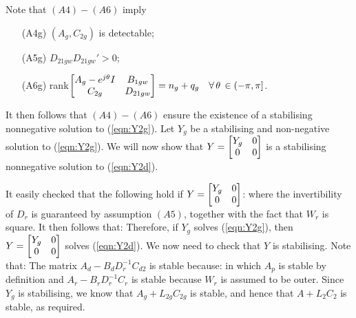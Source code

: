 \begin{pf}
Note that $(A4)-(A6)$ imply 
\begin{itemize}
\item[(A4g)] $(A_g,C_{2g})$ is detectable; 
\item[(A5g)] $D_{21gw}D_{21gw}'>0$;
\item[(A6g)] rank$\begin{bmatrix} A_g-e^{j\theta}I&B_{1gw}\\C_{2g}& D_{21gw} \end{bmatrix}=n_g+q_g\quad \forall\, \theta \,\in (-\pi,\pi]$.
\end{itemize}
%
It then follows that $(A4)-(A6)$ ensure the existence of a stabilising nonnegative solution to (\ref{eqn:Y2g}). 
Let $Y_g$ be a stabilising and non-negative solution to (\ref{eqn:Y2g}). We will now show that $Y=\begin{bmatrix} Y_g&0\\0&0 \end{bmatrix}$ is a stabilising nonnegative solution to (\ref{eqn:Y2d}).

It easily checked that the following hold if $Y=\begin{bmatrix} Y_g&0\\0&0 \end{bmatrix}$:
where the invertibility of $D_r$ is guaranteed by assumption $(A5)$, together with the fact that $W_r$ is square. It then follows that:
Therefore, if $Y_g$ solves (\ref{eqn:Y2g}), then $Y=\begin{bmatrix} Y_g&0\\0&0 \end{bmatrix}$ solves (\ref{eqn:Y2d}). We now need to check that $Y$ is stabilising. Note that:
The matrix $A_d-B_dD_r^{-1}C_{d2}$ is stable because:
in which $A_p$ is stable by definition and $A_r-B_rD_r^{-1}C_r$ is stable because $W_r$ is assumed to be outer. Since $Y_g$ is stabilising, we know that $A_g+L_{2g}C_{2g}$ is stable, and hence that $A+L_2C_2$ is stable, as required. 
 \end{pf}

